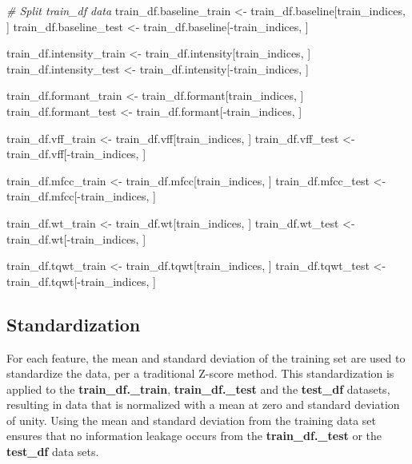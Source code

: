\documentclass[
]{article}
\newenvironment{Shaded}{\begin{snugshade}}{\end{snugshade}}
\newcommand{\CommentTok}[1]{\textcolor[rgb]{0.56,0.35,0.01}{\textit{#1}}}
\newcommand{\NormalTok}[1]{#1}
\newcommand{\OtherTok}[1]{\textcolor[rgb]{0.56,0.35,0.01}{#1}}
\newcommand{\SpecialCharTok}[1]{\textcolor[rgb]{0.00,0.00,0.00}{#1}}
\begin{document}
\begin{Shaded}
\begin{Highlighting}[]
\CommentTok{\# Split train\_df data}
\NormalTok{train\_df.baseline\_train }\OtherTok{\textless{}{-}}\NormalTok{ train\_df.baseline[train\_indices, ]}
\NormalTok{train\_df.baseline\_test }\OtherTok{\textless{}{-}}\NormalTok{ train\_df.baseline[}\SpecialCharTok{{-}}\NormalTok{train\_indices, ]}

\NormalTok{train\_df.intensity\_train }\OtherTok{\textless{}{-}}\NormalTok{ train\_df.intensity[train\_indices, ]}
\NormalTok{train\_df.intensity\_test }\OtherTok{\textless{}{-}}\NormalTok{ train\_df.intensity[}\SpecialCharTok{{-}}\NormalTok{train\_indices, ]}

\NormalTok{train\_df.formant\_train }\OtherTok{\textless{}{-}}\NormalTok{ train\_df.formant[train\_indices, ]}
\NormalTok{train\_df.formant\_test }\OtherTok{\textless{}{-}}\NormalTok{ train\_df.formant[}\SpecialCharTok{{-}}\NormalTok{train\_indices, ]}

\NormalTok{train\_df.vff\_train }\OtherTok{\textless{}{-}}\NormalTok{ train\_df.vff[train\_indices, ]}
\NormalTok{train\_df.vff\_test }\OtherTok{\textless{}{-}}\NormalTok{ train\_df.vff[}\SpecialCharTok{{-}}\NormalTok{train\_indices, ]}

\NormalTok{train\_df.mfcc\_train }\OtherTok{\textless{}{-}}\NormalTok{ train\_df.mfcc[train\_indices, ]}
\NormalTok{train\_df.mfcc\_test }\OtherTok{\textless{}{-}}\NormalTok{ train\_df.mfcc[}\SpecialCharTok{{-}}\NormalTok{train\_indices, ]}

\NormalTok{train\_df.wt\_train }\OtherTok{\textless{}{-}}\NormalTok{ train\_df.wt[train\_indices, ]}
\NormalTok{train\_df.wt\_test }\OtherTok{\textless{}{-}}\NormalTok{ train\_df.wt[}\SpecialCharTok{{-}}\NormalTok{train\_indices, ]}

\NormalTok{train\_df.tqwt\_train }\OtherTok{\textless{}{-}}\NormalTok{ train\_df.tqwt[train\_indices, ]}
\NormalTok{train\_df.tqwt\_test }\OtherTok{\textless{}{-}}\NormalTok{ train\_df.tqwt[}\SpecialCharTok{{-}}\NormalTok{train\_indices, ]}
\end{Highlighting}
\end{Shaded}

\newpage

\hypertarget{standardization}{%
\subsection{Standardization}\label{standardization}}

For each feature, the mean and standard deviation of the training set are used to standardize the data, per a traditional Z-score method. This standardization is applied to the \textbf{train\_df.\_train}, \textbf{train\_df.\_test} and the \textbf{test\_df} datasets, resulting in data that is normalized with a mean at zero and standard deviation of unity. Using the mean and standard deviation from the training data set ensures that no information leakage occurs from the \textbf{train\_df.\_test} or the \textbf{test\_df} data sets.
\end{document}
